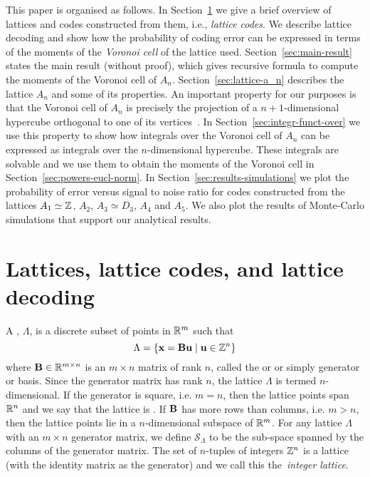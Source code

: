 \documentclass[draftcls, onecolumn, 11pt]{IEEEtran}
\begin{document}
This paper is organised as follows.  In Section~\ref{sec:latt-latt-codes} we give a brief overview of lattices and codes constructed from them, i.e., \emph{lattice codes}.  We describe lattice decoding and show how the probability of coding error can be expressed in terms of the moments of the \emph{Voronoi cell} of the lattice used.  Section~\ref{sec:main-result} states the main result (without proof), which gives recursive formula to compute the moments of the Voronoi cell of $A_n$.  Section~\ref{sec:lattice-a_n} describes the lattice $A_n$ and some of its properties.  An important property for our purposes is that the Voronoi cell of $A_n$ is precisely the projection of a $n+1$-dimensional hypercube orthogonal to one of its vertices~\cite{McKilliam2009CoxeterLattices,McKilliam2010thesis}.
In Section~\ref{sec:integr-funct-over} we use this property to show how integrals over the Voronoi cell of $A_n$ can be expressed as integrals over the $n$-dimensional hypercube. These integrals are solvable and we use them to obtain the moments of the Voronoi cell in Section~\ref{sec:powers-eucl-norm}.  In Section~\ref{sec:results-simulations} we plot the probability of error versus signal to noise ratio for codes constructed from the lattices $A_1 \simeq {\mathbb Z}$, $A_2$, $A_3 \simeq D_3$, $A_4$ and $A_5$.  We also plot the results of Monte-Carlo simulations that support our analytical results.




\section{Lattices, lattice codes, and lattice decoding} \label{sec:latt-latt-codes}


A , $\Lambda$, is a discrete subset of points in ${\mathbb R}^m$ such that
\[
   \Lambda = \{\mathbf{x} = \mathbf{B}\mathbf{u} \mid \mathbf{u} \in {\mathbb Z}^n \}
 \]
 where $\mathbf{B} \in {\mathbb R}^{m \times n}$ is an $m \times n$ matrix of rank $n$, called the  or  or simply generator or basis. Since the generator matrix has rank $n$, the lattice $\Lambda$ is termed $n$-dimensional. If the generator is square, i.e. $m = n$, then the lattice points span ${\mathbb R}^n$ and we say that the lattice is . If $\mathbf{B}$ has more rows than columns, i.e. $m > n$, then the lattice points lie in a $n$-dimensional subspace of ${\mathbb R}^m$. For any lattice $\Lambda$ with an $m \times n$ generator matrix, we define $\mathcal{S}_{\Lambda}$ to be the sub-space spanned by the columns of the generator matrix. The set of $n$-tuples of integers ${\mathbb Z}^n$ is a lattice (with the identity matrix as the generator) and we call this the~\emph{integer lattice}.
\end{document}

